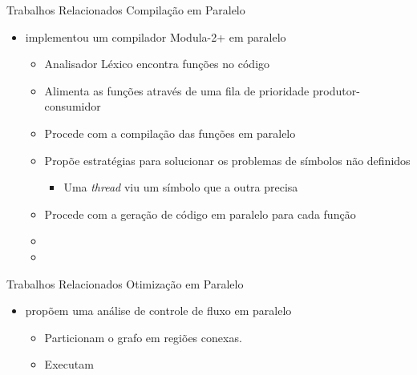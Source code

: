 \begin{frame}{Trabalhos Relacionados}
    Compilação em Paralelo
    \begin{itemize}
        \item \cite{wortman1992} implementou um compilador Modula-2+ em paralelo
            \begin{itemize}
                \item Analisador Léxico encontra funções no código
                \item Alimenta as funções através de uma fila de prioridade produtor-consumidor
                \item Procede com a compilação das funções em paralelo
                \item Propõe estratégias para solucionar os problemas de símbolos não definidos
                    \begin{itemize}
                        \item Uma \textit{thread} viu um símbolo que a outra precisa
                    \end{itemize}
                \item Procede com a geração de código em paralelo para cada função
                \item[]
                \item {\color{red}{Não discute otimização}}
            \end{itemize}
    \end{itemize}
\end{frame}

\begin{frame}{Trabalhos Relacionados}
    Otimização em Paralelo 

    \begin{itemize}
        \item \cite{Lee1994} propõem uma análise de controle de fluxo em paralelo
            \begin{itemize}
                \item Particionam o grafo em regiões conexas.
                \item Executam
            \end{itemize}
    \end{itemize}

\end{frame}

